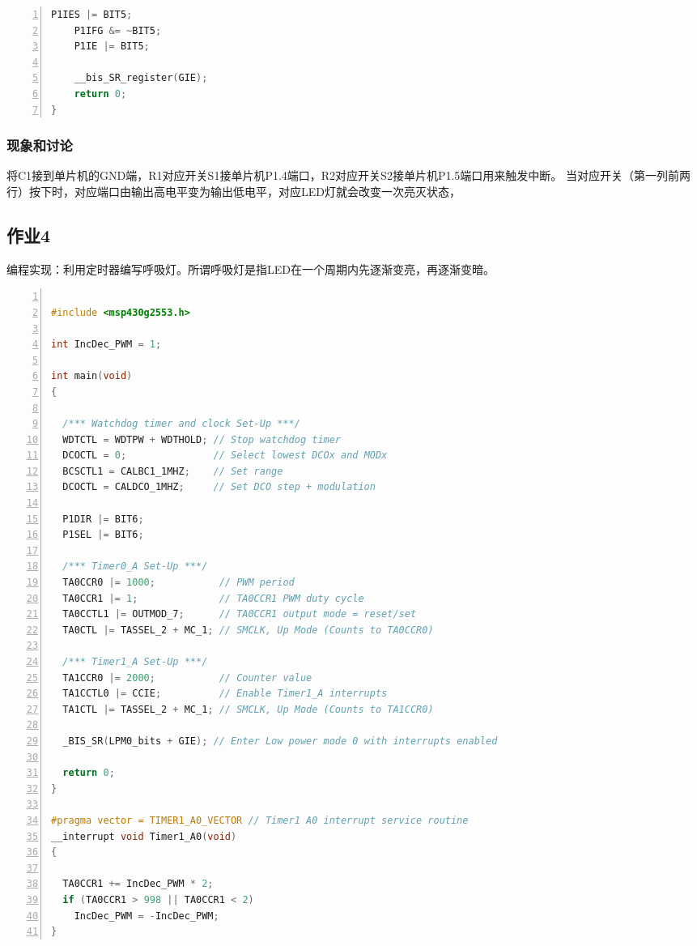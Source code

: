 \documentclass[a4paper,twoside,zihao=5,UTF8]{ctexart}
\begin{document}
\begin{spacing}{1.2}
\begin{lstlisting}[language=c++,numbers=left,style=CppStyle,caption=作业3,label={code:p3}]
    P1IES |= BIT5;
    P1IFG &= ~BIT5;
    P1IE |= BIT5;

    __bis_SR_register(GIE);
    return 0;
}
\end{lstlisting}

\subsubsection{现象和讨论}
将C1接到单片机的GND端，R1对应开关S1接单片机P1.4端口，R2对应开关S2接单片机P1.5端口用来触发中断。
当对应开关（第一列前两行）按下时，对应端口由输出高电平变为输出低电平，对应LED灯就会改变一次亮灭状态，

\subsection{作业4}
编程实现：利用定时器编写呼吸灯。所谓呼吸灯是指LED在一个周期内先逐渐变亮，再逐渐变暗。

\begin{lstlisting}[language=c++,numbers=left,style=CppStyle,caption=作业4,label={code:p4}]

#include <msp430g2553.h>

int IncDec_PWM = 1;

int main(void)
{

  /*** Watchdog timer and clock Set-Up ***/
  WDTCTL = WDTPW + WDTHOLD; // Stop watchdog timer
  DCOCTL = 0;               // Select lowest DCOx and MODx
  BCSCTL1 = CALBC1_1MHZ;    // Set range
  DCOCTL = CALDCO_1MHZ;     // Set DCO step + modulation

  P1DIR |= BIT6;
  P1SEL |= BIT6;

  /*** Timer0_A Set-Up ***/
  TA0CCR0 |= 1000;           // PWM period
  TA0CCR1 |= 1;              // TA0CCR1 PWM duty cycle
  TA0CCTL1 |= OUTMOD_7;      // TA0CCR1 output mode = reset/set
  TA0CTL |= TASSEL_2 + MC_1; // SMCLK, Up Mode (Counts to TA0CCR0)

  /*** Timer1_A Set-Up ***/
  TA1CCR0 |= 2000;           // Counter value
  TA1CCTL0 |= CCIE;          // Enable Timer1_A interrupts
  TA1CTL |= TASSEL_2 + MC_1; // SMCLK, Up Mode (Counts to TA1CCR0)

  _BIS_SR(LPM0_bits + GIE); // Enter Low power mode 0 with interrupts enabled

  return 0;
}

#pragma vector = TIMER1_A0_VECTOR // Timer1 A0 interrupt service routine
__interrupt void Timer1_A0(void)
{

  TA0CCR1 += IncDec_PWM * 2;
  if (TA0CCR1 > 998 || TA0CCR1 < 2)
    IncDec_PWM = -IncDec_PWM;
}
\end{lstlisting}


\end{spacing}
\end{document}
